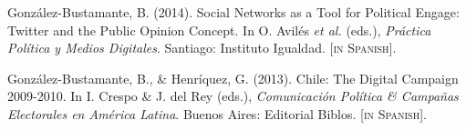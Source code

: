 \begin{publications}
\begin{benumerate}{12}
\item{\small Gonz\'alez-Bustamante, B. (2014). Social Networks as a Tool for Political Engage: Twitter and the Public Opinion Concept. In O. Avil\'es {\itshape et al.} (eds.), {\itshape Pr\'actica Pol\'itica y Medios Digitales}. Santiago: Instituto Igualdad. {\footnotesize \scshape [in Spanish]}.}\vspace{1mm}

\item{\small Gonz\'alez-Bustamante, B., \& Henr\'iquez, G. (2013). Chile: The Digital Campaign 2009-2010. In I. Crespo \& J. del Rey (eds.), {\itshape Comunicaci\'on Pol\'itica \& Campa\~nas Electorales en Am\'erica Latina}. Buenos Aires: Editorial Biblos. {\footnotesize \scshape [in Spanish].}}\vspace{1mm}

\end{benumerate}

\end{publications}